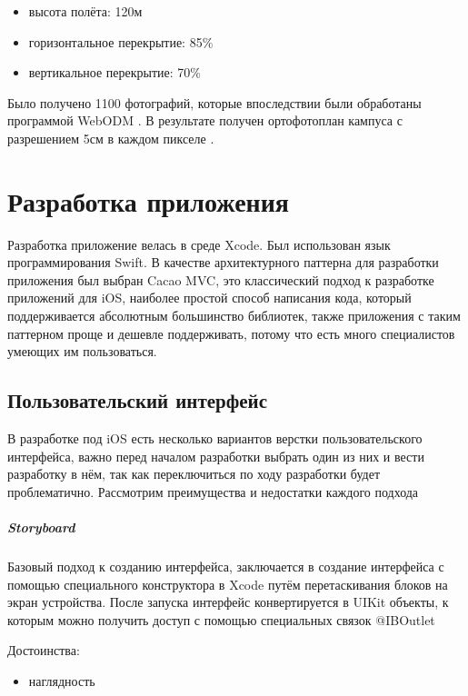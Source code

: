       \begin{itemize}
        \item высота полёта: 120м
        \item горизонтальное перекрытие: 85\%
        \item вертикальное перекрытие: 70\%
      \end{itemize}

      Было получено 1100 фотографий, которые впоследствии были обработаны программой WebODM \cite{WebODM}. В результате получен ортофотоплан кампуса с разрешением 5см в каждом пикселе .


\chapter{Разработка приложения}
  Разработка приложение велась в среде Xcode. Был использован язык программирования Swift. В качестве архитектурного паттерна для разработки приложения был выбран Cacao MVC, это классический подход к разработке приложений для iOS, наиболее простой способ написания кода, который поддерживается абсолютным большинство библиотек, также приложения с таким паттерном проще и дешевле поддерживать, потому что есть много специалистов умеющих им пользоваться.

  \section{Пользовательский интерфейс}
    В разработке под iOS есть несколько вариантов верстки пользовательского интерфейса, важно перед началом разработки выбрать один из них и вести разработку в нём, так как переключиться по ходу разработки будет проблематично. Рассмотрим преимущества и недостатки каждого подхода

    \paragraph{Storyboard}
      Базовый подход к созданию интерфейса, заключается в создание интерфейса с помощью специального конструктора в Xcode путём перетаскивания блоков на экран устройства. После запуска интерфейс конвертируется в UIKit объекты, к которым можно получить доступ с помощью специальных связок @IBOutlet

      \noindent Достоинства:
      \begin{itemize}
        \item наглядность
      \end{itemize}

